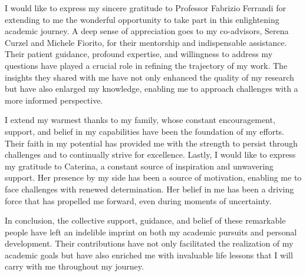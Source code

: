 I would like to express my sincere gratitude to Professor Fabrizio Ferrandi for extending to me the wonderful opportunity to take part in this enlightening academic journey.
A deep sense of appreciation goes to my co-advisors, Serena Curzel and Michele Fiorito, for their mentorship and indispensable assistance.
Their patient guidance, profound expertise, and willingness to address my questions have played a crucial role in refining the trajectory of my work.
The insights they shared with me have not only enhanced the quality of my research but have also enlarged my knowledge, enabling me to approach challenges with a more informed perspective.

I extend my warmest thanks to my family, whose constant encouragement, support, and belief in my capabilities have been the foundation of my efforts.
Their faith in my potential has provided me with the strength to persist through challenges and to continually strive for excellence.
Lastly, I would like to express my gratitude to Caterina, a constant source of inspiration and unwavering support.
Her presence by my side has been a source of motivation, enabling me to face challenges with renewed determination.
Her belief in me has been a driving force that has propelled me forward, even during moments of uncertainty.

In conclusion, the collective support, guidance, and belief of these remarkable people have left an indelible imprint on both my academic pursuits and personal development.
Their contributions have not only facilitated the realization of my academic goals but have also enriched me with invaluable life lessons that I will carry with me throughout my journey.